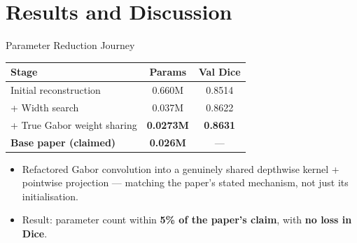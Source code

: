 \documentclass[11pt]{beamer}
\begin{document}
\section{Results and Discussion}

\begin{frame}{Parameter Reduction Journey}
    \begin{table}
        \centering
        \small
        \begin{tabular}{l|c|c}
            \hline
            \textbf{Stage} & \textbf{Params} & \textbf{Val Dice} \\ \hline
            Initial reconstruction & 0.660M & 0.8514 \\ \hline
            + Width search          & 0.037M & 0.8622 \\ \hline
            + True Gabor weight sharing & \textbf{0.0273M} & \textbf{0.8631} \\ \hline
            \textbf{Base paper (claimed)} & \textbf{0.026M} & --- \\ \hline
        \end{tabular}
    \end{table}

    \begin{itemize}
        \item Refactored Gabor convolution into a genuinely shared depthwise
              kernel + pointwise projection --- matching the paper's stated
              mechanism, not just its initialisation.
        \item Result: parameter count within \textbf{5\% of the paper's claim},
              with \textbf{no loss in Dice}.
    \end{itemize}
\end{frame}
\end{document}
